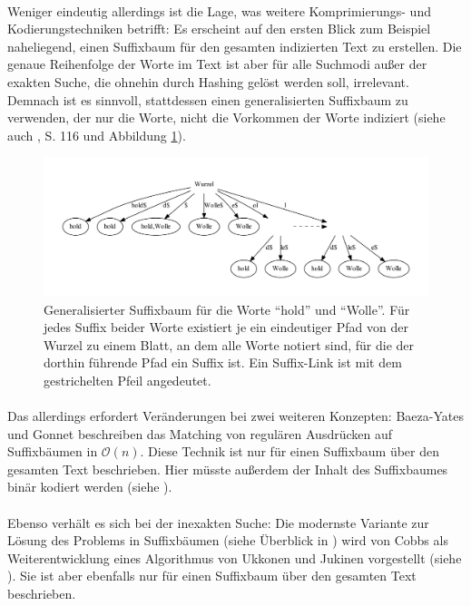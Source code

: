 \paragraph{} Weniger eindeutig allerdings ist die Lage, was weitere Komprimierungs- und Kodierungstechniken betrifft: Es erscheint auf den ersten Blick zum Beispiel naheliegend, einen Suffixbaum für den gesamten indizierten Text zu erstellen. Die genaue Reihenfolge der Worte im Text ist aber für alle Suchmodi außer der exakten Suche, die ohnehin durch Hashing gelöst werden soll, irrelevant. Demnach ist es sinnvoll, stattdessen einen generalisierten Suffixbaum zu verwenden, der nur die Worte, nicht die Vorkommen der Worte indiziert (siehe auch \cite{gusfield}, S. 116 und Abbildung \ref{fig-wolleHoldSuffixTree}).

\begin{figure}
\includegraphics[scale=0.5]{resources/wolleHoldSuffixTree.pdf}
\caption{Generalisierter Suffixbaum für die Worte "`hold"' und "`Wolle"'. Für jedes Suffix beider Worte existiert je ein eindeutiger Pfad von der Wurzel zu einem Blatt, an dem alle Worte notiert sind, für die der dorthin führende Pfad ein Suffix ist. Ein Suffix-Link ist mit dem gestrichelten Pfeil angedeutet.}
\label{fig-wolleHoldSuffixTree}
\end{figure}

\paragraph{} Das allerdings erfordert Veränderungen bei zwei weiteren Konzepten: Baeza-Yates und Gonnet beschreiben das Matching von regulären Ausdrücken auf Suffixbäumen in $\mathcal{O}(n)$. Diese Technik ist nur für einen Suffixbaum über den gesamten Text beschrieben. Hier müsste außerdem der Inhalt des Suffixbaumes binär kodiert werden (siehe \cite{baeza-yates}).
\paragraph{} Ebenso verhält es sich bei der inexakten Suche: Die modernste Variante zur Lösung des Problems in Suffixbäumen (siehe Überblick in \cite{approximateIndexing}) wird von Cobbs als Weiterentwicklung eines Algorithmus von Ukkonen und Jukinen vorgestellt (siehe \cite{approxTreesUkkonen1,approxTreesUkkonen2,approxTreesCobbs}). Sie ist aber ebenfalls nur für einen Suffixbaum über den gesamten Text beschrieben.

